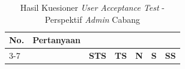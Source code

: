 \begin{longtable}{|p{0.8cm}|p{7.5cm}|>{\centering\arraybackslash}p{0.8cm}|>{\centering\arraybackslash}p{0.8cm}|>{\centering\arraybackslash}p{0.8cm}|>{\centering\arraybackslash}p{0.8cm}|>{\centering\arraybackslash}p{0.8cm}|}
    \caption{Hasil Kuesioner \textit{User Acceptance Test} - Perspektif \textit{Admin} Cabang} \label{tabel:uat_admin_cabang_hasil}                                                                                                                                                    \\
    \hline
    \multirow{2}{*}{\textbf{No.}}              & \multirow{2}{*}{\textbf{Pertanyaan}}                                                                                                    & \multicolumn{5}{c|}{\textbf{Jawaban}}                                                       \\ \cline{3-7}
                                               &                                                                                                                                         & \textbf{STS}                          & \textbf{TS} & \textbf{N} & \textbf{S} & \textbf{SS} \\
    \hline
    \endfirsthead




\end{longtable}
